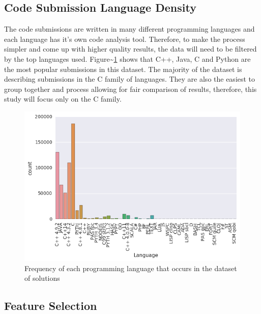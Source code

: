 \documentclass{article}
\begin{document}
\subsection{Code Submission Language
Density}\label{code-submission-language-density}

The code submissions are written in many different programming languages
and each language has it's own code analysis tool. Therefore, to make
the process simpler and come up with higher quality results, the data
will need to be filtered by the top languages used.
Figure\textasciitilde{}\ref{languages} shows that C++, Java, C and
Python are the most popular submissions in this dataset. The majority of
the dataset is describing submissions in the C family of languages. They
are also the easiest to group together and process allowing for fair
comparison of results, therefore, this study will focus only on the C
family.

\begin{figure}[ht] \vskip 0.2in \begin{center}
\centerline{\includegraphics[width=\columnwidth]{../images/languages.png}}
\caption{Frequency of each programming language that occurs in the dataset of
solutions } \label{languages} \end{center} \vskip -0.2in \end{figure}

\citet{kernalnlp}

\subsection{Feature Selection}\label{feature-selection}
\end{document}
